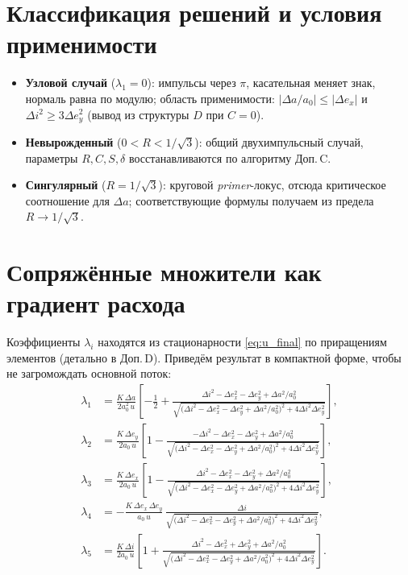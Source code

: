 \documentclass[12pt,a4paper]{article}
\begin{document}
\section{Классификация решений и условия применимости}
\begin{itemize}
\item \textbf{Узловой случай} ($\lambda_1=0$): импульсы через $\pi$, касательная меняет знак, нормаль равна по модулю; область применимости:
$|\Delta a/a_0|\le |\Delta e_x|$ и $\Delta i^2\ge 3\Delta e_y^2$ (вывод из структуры $D$ при $C=0$).
\item \textbf{Невырожденный} ($0<R<1/\sqrt{3}$): общий двухимпульсный случай, параметры $R,C,S,\delta$ восстанавливаются по алгоритму Доп.\,C.
\item \textbf{Сингулярный} ($R=1/\sqrt{3}$): круговой \emph{primer}-локус, отсюда критическое соотношение для $\Delta a$; соответствующие формулы получаем из предела $R\to 1/\sqrt{3}$.
\end{itemize}

\section{Сопряжённые множители как градиент расхода}
Коэффициенты $\lambda_i$ находятся из стационарности \eqref{eq:u_final} по приращениям элементов (детально в Доп.\,D).
Приведём результат в компактной форме, чтобы не загромождать основной поток:
\begin{align}
\lambda_1 &= \frac{K\,\Delta a}{2a_0^2\,u}\left[-\frac12+\frac{\Delta i^2-\Delta e_x^2-\Delta e_y^2+\Delta a^2/a_0^2}{\sqrt{\bigl(\Delta i^2-\Delta e_x^2-\Delta e_y^2+\Delta a^2/a_0^2\bigr)^2+4\Delta i^2\Delta e_y^2}}\right],\\
\lambda_2 &= \frac{K\,\Delta e_y}{2a_0\,u}\left[1-\frac{-\Delta i^2-\Delta e_x^2-\Delta e_y^2+\Delta a^2/a_0^2}{\sqrt{\bigl(\Delta i^2-\Delta e_x^2-\Delta e_y^2+\Delta a^2/a_0^2\bigr)^2+4\Delta i^2\Delta e_y^2}}\right],\\
\lambda_3 &= \frac{K\,\Delta e_x}{2a_0\,u}\left[1-\frac{\Delta i^2-\Delta e_x^2-\Delta e_y^2+\Delta a^2/a_0^2}{\sqrt{\bigl(\Delta i^2-\Delta e_x^2-\Delta e_y^2+\Delta a^2/a_0^2\bigr)^2+4\Delta i^2\Delta e_y^2}}\right],\\
\lambda_4 &= -\frac{K\,\Delta e_x\,\Delta e_y}{a_0\,u}\,\frac{\Delta i}{\sqrt{\bigl(\Delta i^2-\Delta e_x^2-\Delta e_y^2+\Delta a^2/a_0^2\bigr)^2+4\Delta i^2\Delta e_y^2}},\\
\lambda_5 &= \frac{K\,\Delta i}{2a_0\,u}\left[1+\frac{\Delta i^2-\Delta e_x^2+\Delta e_y^2+\Delta a^2/a_0^2}{\sqrt{\bigl(\Delta i^2-\Delta e_x^2-\Delta e_y^2+\Delta a^2/a_0^2\bigr)^2+4\Delta i^2\Delta e_y^2}}\right].
\end{align}
\end{document}
